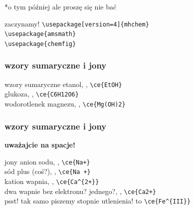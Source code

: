 \documentclass{beamer}
\theoremstyle{newblock}
\begin{document}
\begin{frame}[standout]
    *o tym później ale proszę się nie bać
\end{frame}

\begin{frame}[fragile]
    \begin{exampleblock}{zaczynamy!}
        \verb|\usepackage[version=4]{mhchem}| \\
        \verb|\usepackage{amsmath}| \\
        \verb|\usepackage{chemfig}|
    \end{exampleblock}
\end{frame}

\begin{frame}[fragile]
    \frametitle{wzory sumaryczne i jony}
    \begin{exampleblock}{wzory sumaryczne}
        etanol, , \verb|\ce{EtOH}| \\ \vspace{3mm}
        glukoza, , \verb|\ce{C6H12O6}| \\ \vspace{3mm}
        wodorotlenek magnezu, , \verb|\ce{Mg(OH)2}|
    \end{exampleblock}
\end{frame}

\begin{frame}[fragile]
    \frametitle{wzory sumaryczne i jony}
    \textbf{uważajcie na spacje!}
    \begin{exampleblock}{jony}
        anion sodu, , \verb|\ce{Na+}| \\ \vspace{1mm}
        sód plus (coś?), , \verb|\ce{Na +}| \\ \vspace{1mm}
        kation wapnia, , \verb|\ce{Ca^{2+}}| \\ \vspace{1mm}
        \pause dwa wapnie bez elektronu? jednego?, , \verb|\ce{Ca2+}| \\ \vspace{3mm}
        \pause psst! tak samo piszemy stopnie utlenienia!  to \verb|\ce{Fe^{III}}|
    \end{exampleblock}
\end{frame}

\newcommand\showmycounter{\addtocounter{cwiczenia}{1}\thecwiczenia}
\end{document}
